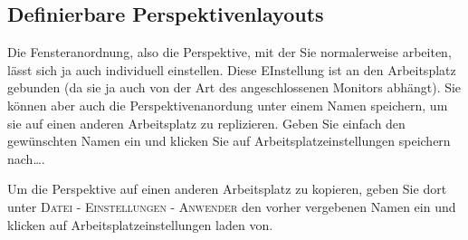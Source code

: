 \subsection{Definierbare Perspektivenlayouts}
Die Fensteranordnung, also die Perspektive, mit der Sie normalerweise arbeiten,
lässt sich ja auch individuell einstellen. Diese EInstellung ist an den
Arbeitsplatz gebunden (da sie ja auch von der Art des angeschlossenen Monitors
abhängt). Sie können aber auch die Perspektivenanordung unter einem Namen
speichern, um sie auf einen anderen Arbeitsplatz zu replizieren. Geben Sie
einfach den gewünschten Namen ein  und klicken Sie auf \glqq
Arbeitsplatzeinstellungen speichern nach\ldots\grqq{}.

Um die Perspektive auf einen anderen Arbeitsplatz zu kopieren, geben Sie dort
unter \textsc{Datei - Einstellungen - Anwender} den vorher vergebenen Namen ein
und klicken auf \glqq Arbeitsplatzeinstellungen laden von\grqq{}.


